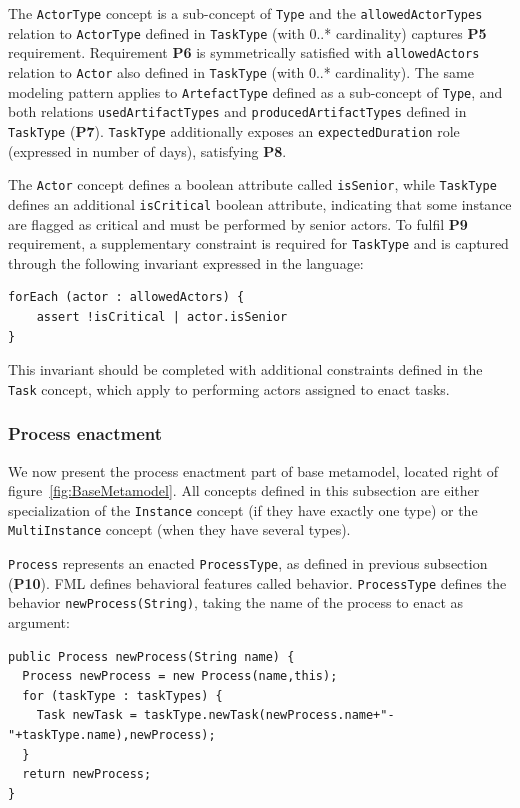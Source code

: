 The \texttt{ActorType} concept is a sub-concept of \texttt{Type} and the \texttt{allowedActorTypes} relation to \texttt{ActorType} defined in \texttt{TaskType} (with 0..* cardinality) captures \textbf{P5} requirement. Requirement \textbf{P6} is symmetrically satisfied with \texttt{allowedActors} relation to \texttt{Actor} also defined in \texttt{TaskType} (with 0..* cardinality). The same modeling pattern applies to \texttt{ArtefactType} defined as a sub-concept of \texttt{Type}, and both relations \texttt{usedArtifactTypes} and \texttt{producedArtifactTypes} defined in \texttt{TaskType} (\textbf{P7}). \texttt{TaskType} additionally exposes an \texttt{expectedDuration} role (expressed in number of days), satisfying \textbf{P8}.

The \texttt{Actor} concept defines a boolean attribute called \texttt{isSenior}, while \texttt{TaskType} defines an additional \texttt{isCritical} boolean attribute, indicating that some instance are flagged as critical and must be performed by senior actors. To fulfil \textbf{P9} requirement, a supplementary constraint is required for \texttt{TaskType} and is captured through the following invariant expressed in the \FML language:

\begin{lstlisting}
forEach (actor : allowedActors) {
    assert !isCritical | actor.isSenior
}
\end{lstlisting}

This invariant should be completed with additional constraints defined in the \texttt{Task} concept, which apply to performing actors assigned to enact tasks. 

\subsubsection{Process enactment}
\label{sec:ProcessEnactment}
We now present the process enactment part of base metamodel, located right of figure~\ref{fig:BaseMetamodel}. All concepts defined in this subsection are either specialization of the \texttt{Instance} concept (if they have exactly one type) or the \texttt{MultiInstance} concept (when they have several types).

\texttt{Process} represents an enacted \texttt{ProcessType}, as defined in previous subsection (\textbf{P10}). FML defines behavioral features called behavior. \texttt{ProcessType} defines the behavior \texttt{newProcess(String)}, taking the name of the process to enact as argument:

\begin{lstlisting}
public Process newProcess(String name) {    
  Process newProcess = new Process(name,this);  
  for (taskType : taskTypes) {      
    Task newTask = taskType.newTask(newProcess.name+"-"+taskType.name),newProcess);        
  }      
  return newProcess;    
}    
\end{lstlisting}

